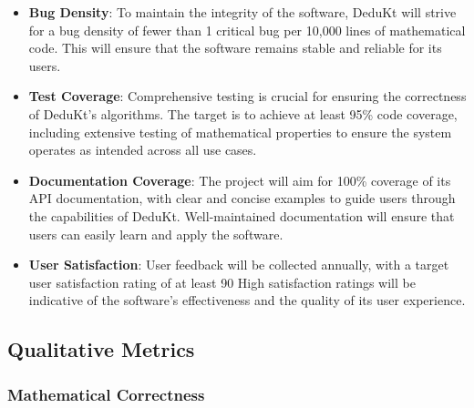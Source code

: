 \begin{itemize}
    \item \textbf{Bug Density}: To maintain the integrity of the software, DeduKt will strive for a bug density of fewer than 1 critical bug per 10,000 lines of mathematical code.
    This will ensure that the software remains stable and reliable for its users.

    \item \textbf{Test Coverage}: Comprehensive testing is crucial for ensuring the correctness of DeduKt's algorithms.
    The target is to achieve at least 95\% code coverage, including extensive testing of mathematical properties to ensure the system operates as intended across all use cases.

    \item \textbf{Documentation Coverage}: The project will aim for 100\% coverage of its API documentation, with clear and concise examples to guide users through the capabilities of DeduKt.
    Well-maintained documentation will ensure that users can easily learn and apply the software.

    \item \textbf{User Satisfaction}: User feedback will be collected annually, with a target user satisfaction rating of at least 90%
    High satisfaction ratings will be indicative of the software’s effectiveness and the quality of its user experience.
\end{itemize}

\subsection{Qualitative Metrics}\label{subsec:qualitative-metrics}

\subsubsection{Mathematical Correctness}

